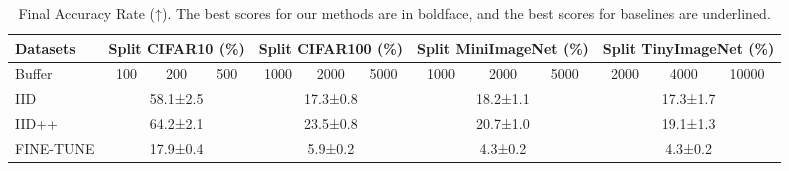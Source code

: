 
\begin{table}[t]\small
\renewcommand\tabcolsep{2pt}
\centering
\caption{Final Accuracy Rate (↑). The best scores for our methods are in boldface, and the best scores for baselines are underlined.}
\vspace{-2ex}
\label{tableaccuracy}
\begin{tabular}{l|ccc|ccc|ccc|ccc}
\hline
Datasets & \multicolumn{3}{c|}{Split CIFAR10 (\%)} & \multicolumn{3}{c|}{Split CIFAR100 (\%)}& \multicolumn{3}{c|}{Split MiniImageNet (\%)} & \multicolumn{3}{c}{Split TinyImageNet (\%)}\\ \hline
Buffer & \multicolumn{1}{c|}{100} & \multicolumn{1}{c|}{200} & \multicolumn{1}{c|}{500} & \multicolumn{1}{c|}{1000}    & \multicolumn{1}{c|}{2000} & \multicolumn{1}{c|}{5000} & \multicolumn{1}{c|}{1000} & \multicolumn{1}{c|}{2000}     &\multicolumn{1}{c|}{5000} & \multicolumn{1}{c|}{2000} & \multicolumn{1}{c|}{4000} & 10000     \\ \hline
IID          & \multicolumn{3}{c|}{58.1\scriptsize±2.5}                                  & \multicolumn{3}{c|}{17.3\scriptsize±0.8}                                     & \multicolumn{3}{c|}{18.2\scriptsize±1.1} & \multicolumn{3}{c}{17.3\scriptsize±1.7}                                    \\
IID++~\cite{caccia2021new}          & \multicolumn{3}{c|}{64.2\scriptsize±2.1}                                  & \multicolumn{3}{c|}{23.5\scriptsize±0.8}                                     & \multicolumn{3}{c|}{20.7\scriptsize±1.0} & \multicolumn{3}{c}{19.1\scriptsize±1.3}                                    \\
FINE-TUNE          & \multicolumn{3}{c|}{17.9\scriptsize±0.4}                                  & \multicolumn{3}{c|}{5.9\scriptsize±0.2}                                     & \multicolumn{3}{c|}{4.3\scriptsize±0.2} & \multicolumn{3}{c}{4.3\scriptsize±0.2}                                    \\\hline


\end{tabular}
\end{table}
